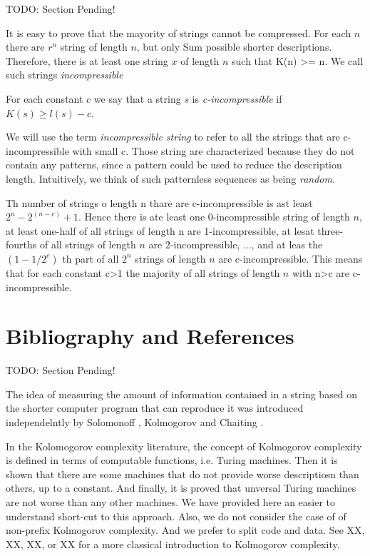 {\color{red} TODO: Section Pending!}

It is easy to prove that the mayority of strings cannot be compressed. For each $n$ there are $r^n$ string of length $n$, but only Sum possible shorter descriptions. Therefore, there is at least one string $x$ of length $n$ such that K(n) >= n. We call such strings \emph{incompressible}

\begin{definition}
For each constant $c$ we say that a string $s$ is \emph{c-incompressible} if $K(s)\geq l(s)-c$.
\end{definition}

We will use the term \emph{incompressible string} to refer to all the strings that are c-incompressible with small c. Those string are characterized because they do not contain any patterns, since a pattern could be used to reduce the description length. Intuitively, we think of such patternless sequences as being \emph{random}.

Th number of strings o length n thare are c-incompressible is ast least $2^n - 2^(n-c) + 1$. Hence there is ate least one 0-incompressible string of length $n$, at least one-half of all strings of length n are 1-incompressible, at lesat three-fourths of all strings of length $n$ are 2-incompressible, ..., and at leas the $(1-1/2^c)$ th part of all $2^n$ strings of length $n$ are c-incompressible. This means that for each constant c>1 the majority of all strings of length $n$ with n>c are c-incompressible.


%
%

\section*{Bibliography and References}

{\color{red} TODO: Section Pending!}

The idea of measuring the amount of information contained in a string based on the shorter computer program that can reproduce it was introduced independelntly by Solomonoff \cite{solomonoff1964formal}, Kolmogorov \cite{kolmogorov1965three} and Chaiting \cite{chaitin1969simplicity}.

In the Kolomogorov complexity literature, the concept of Kolmogorov complexity is defined in terms of computable functions, i.e. Turing machines. Then it is shown that there are some machines that do not provide worse descriptiosn than others, up to a constant. And finally, it is proved that unversal Turing machines are not worse than any other machines. We have provided here an easier to understand short-cut to this approach. Also, we do not consider the case of of non-prefix Kolmogorov complexity. And we prefer to split code and data. See XX, XX, XX, or XX for a more classical introduction to Kolmogorov complexity.


